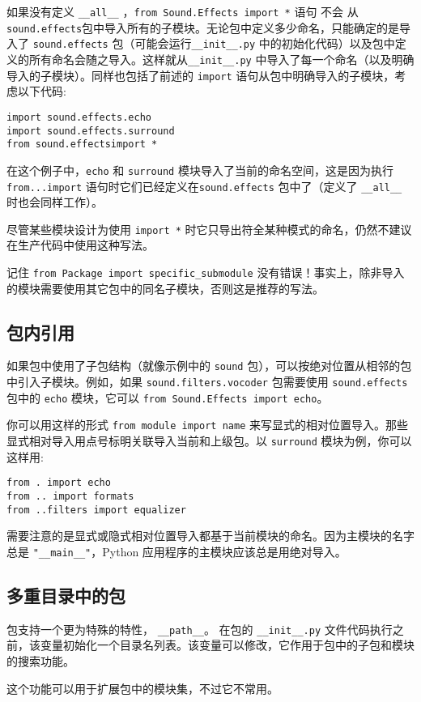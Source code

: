 如果没有定义 \verb|__all__| ，\texttt{from Sound.Effects import *} 语句 不会 从 \texttt{sound.effects}包中导入所有的子模块。无论包中定义多少命名，只能确定的是导入了 \texttt{sound.effects} 包（可能会运行\cprotect\texttt{\verb|__init__|.py} 中的初始化代码）以及包中定义的所有命名会随之导入。这样就从\cprotect\texttt{\verb|__init__|.py} 中导入了每一个命名（以及明确导入的子模块）。同样也包括了前述的 \texttt{import} 语句从包中明确导入的子模块，考虑以下代码:
\begin{lstlisting}
import sound.effects.echo
import sound.effects.surround
from sound.effectsimport *
\end{lstlisting}
在这个例子中，\texttt{echo} 和 \texttt{surround} 模块导入了当前的命名空间，这是因为执行 \texttt{from...import} 语句时它们已经定义在\texttt{sound.effects} 包中了（定义了 \verb|__all__| 时也会同样工作）。

尽管某些模块设计为使用 \texttt{import *} 时它只导出符全某种模式的命名，仍然不建议在生产代码中使用这种写法。

记住 \cprotect\texttt{from Package import \verb|specific_submodule|} 没有错误！事实上，除非导入的模块需要使用其它包中的同名子模块，否则这是推荐的写法。
\subsection{包内引用}
如果包中使用了子包结构（就像示例中的 \texttt{sound} 包），可以按绝对位置从相邻的包中引入子模块。例如，如果 \texttt{sound.filters.vocoder} 包需要使用 \texttt{sound.effects} 包中的 \texttt{echo} 模块，它可以 \texttt{from Sound.Effects import echo}。

你可以用这样的形式 \texttt{from module import name} 来写显式的相对位置导入。那些显式相对导入用点号标明关联导入当前和上级包。以 \texttt{surround} 模块为例，你可以这样用:
\begin{lstlisting}
from . import echo
from .. import formats
from ..filters import equalizer
\end{lstlisting}
需要注意的是显式或隐式相对位置导入都基于当前模块的命名。因为主模块的名字总是 \verb|"__main__"|，Python 应用程序的主模块应该总是用绝对导入。
\subsection{多重目录中的包}
包支持一个更为特殊的特性， \verb|__path__|。 在包的 \cprotect\texttt{\verb|__init__|.py} 文件代码执行之前，该变量初始化一个目录名列表。该变量可以修改，它作用于包中的子包和模块的搜索功能。

这个功能可以用于扩展包中的模块集，不过它不常用。












